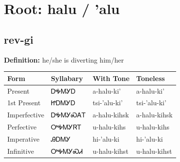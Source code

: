\documentclass{article}%
\begin{document}
%
\normalsize%
\section*{Root: halu / 'alu}%
\subsection*{rev-gi}%
\textbf{Definition: }%
he/she is diverting him/her%
\\[0.5em]%
\begin{tabular}{|l|l|l|l|}%
\hline%
\textbf{Form}&\textbf{Syllabary}&\textbf{With Tone}&\textbf{Toneless}\\%
\hline%
Present&ᎠᎭᎷᎩᎠ&a{-}halu{-}ki'&a{-}halu{-}ki'\\%
1st Present&ᏥᎠᎷᎩᎠ&tsi{-}'alu{-}ki'&tsi{-}'alu{-}ki'\\%
Imperfective&ᎠᎭᎷᎩᏍᎪᎢ&a{-}halu{-}kihsk&a{-}halu{-}kihsk\\%
Perfective&ᎤᎭᎷᎩᏒᎢ&u{-}halu{-}kihs&u{-}halu{-}kihs\\%
Imperative&ᎯᎠᎷᎩ&hi{-}'alu{-}ki&hi{-}'alu{-}ki\\%
Infinitive&ᎤᎭᎷᎩᏍᏗ&u{-}halu{-}kihst&u{-}halu{-}kihst\\%
\hline%
\end{tabular}%
\\[1em]%
\end{document}
